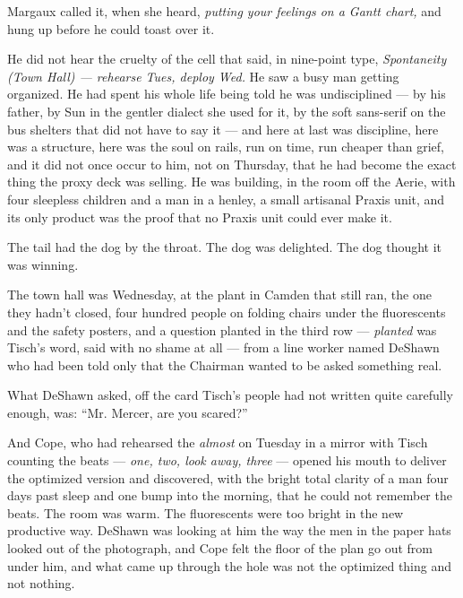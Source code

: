 \documentclass[11pt,openany]{book}
\newcommand{\scenebreak}{\par\vspace{0.5\baselineskip}\begin{center}\textasteriskcentered\quad\textasteriskcentered\quad\textasteriskcentered\end{center}\vspace{0.5\baselineskip}\par}
\begin{document}
Margaux called it, when she heard, \textit{putting your feelings on a Gantt chart,} and hung up before he could toast over it.

He did not hear the cruelty of the cell that said, in nine-point type, \textit{Spontaneity (Town Hall) --- rehearse Tues, deploy Wed.} He saw a busy man getting organized. He had spent his whole life being told he was undisciplined --- by his father, by Sun in the gentler dialect she used for it, by the soft sans-serif on the bus shelters that did not have to say it --- and here at last was discipline, here was a structure, here was the soul on rails, run on time, run cheaper than grief, and it did not once occur to him, not on Thursday, that he had become the exact thing the proxy deck was selling. He was building, in the room off the Aerie, with four sleepless children and a man in a henley, a small artisanal Praxis unit, and its only product was the proof that no Praxis unit could ever make it.

The tail had the dog by the throat. The dog was delighted. The dog thought it was winning.


\scenebreak


The town hall was Wednesday, at the plant in Camden that still ran, the one they hadn't closed, four hundred people on folding chairs under the fluorescents and the safety posters, and a question planted in the third row --- \textit{planted} was Tisch's word, said with no shame at all --- from a line worker named DeShawn who had been told only that the Chairman wanted to be asked something real.

What DeShawn asked, off the card Tisch's people had not written quite carefully enough, was: ``Mr. Mercer, are you scared?''

And Cope, who had rehearsed the \textit{almost} on Tuesday in a mirror with Tisch counting the beats --- \textit{one, two, look away, three} --- opened his mouth to deliver the optimized version and discovered, with the bright total clarity of a man four days past sleep and one bump into the morning, that he could not remember the beats. The room was warm. The fluorescents were too bright in the new productive way. DeShawn was looking at him the way the men in the paper hats looked out of the photograph, and Cope felt the floor of the plan go out from under him, and what came up through the hole was not the optimized thing and not nothing.
\end{document}
